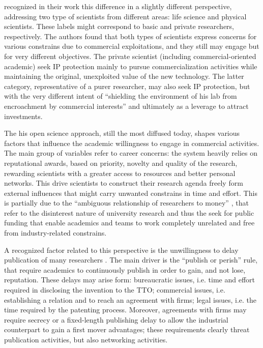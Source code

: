 \citet{OwenSmith2001} recognized in their work this difference in a slightly different perspective, addressing two type of scientists from different areas: life science and physical scientists. These labels might correspond to basic and private researchers, respectively. The authors found that both types of scientists express concerns for various constrains due to commercial exploitations, and they still may engage but for very different objectives. The private scientist (including commercial-oriented academic) seek IP protection mainly to pursue commercialization activities while maintaining the original, unexploited value of the new technology. The latter category, representative of a purer researcher, may also seek IP protection, but with the very different intent of \enquote{shielding the environment of his lab from encroachment by commercial interests} and ultimately as a leverage to attract investments.

The his open science approach, still the most diffused today, shapes various factors that influence the academic willingness to engage in commercial activities. The main group of variables refer to career concerns: the system heavily relies on reputational awards, based on priority, novelty and quality of the research, rewarding scientists with a greater access to resources and better personal networks. This drive scientists to construct their research agenda freely form external influences that might carry unwanted constrains in time and effort. This is partially due to the \enquote{ambiguous relationship of researchers to money} \citep{OShea2004}, that refer to the disinterest nature of university research and thus the seek for public funding that enable academics and teams to work completely unrelated and free from industry-related constrains. 

A recognized factor related to this perspective is the unwillingness to delay publication of many researchers \citep{OShea2004, Thursby2002, Baldini2007}. The main driver is the \enquote{publish or perish} rule, that require academics to continuously publish in order to gain, and not lose, reputation. These delays may arise form: bureaucratic issues, i.e. time and effort required in disclosing the invention to the TTO; commercial issues, i.e. establishing a relation and to reach an agreement with firms; legal issues, i.e. the time required by the patenting process. Moreover, agreements with firms may require secrecy or a fixed-length publishing delay to allow the industrial counterpart to gain a first mover advantages; these requirements clearly threat publication activities, but also networking activities. 

